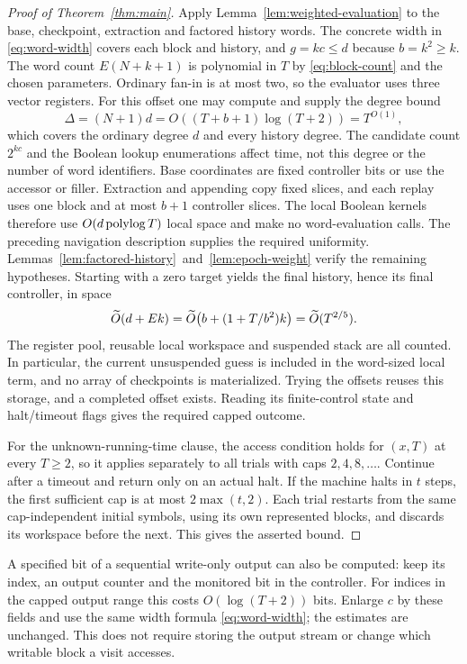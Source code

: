 \begin{proof}[Proof of Theorem~\ref{thm:main}]
Apply Lemma~\ref{lem:weighted-evaluation} to the base, checkpoint,
extraction and factored history words.
The concrete width in \eqref{eq:word-width} covers each block and
history, and \(g=kc\le d\) because \(b=k^2\ge k\). The word count
\(E(N+k+1)\) is polynomial in \(T\) by \eqref{eq:block-count} and the
chosen parameters. Ordinary fan-in is at most two, so the evaluator
uses three vector registers. For this offset one may compute and supply
the degree bound
\[
 \Delta=(N+1)d
 =O((T+b+1)\log(T+2))=T^{O(1)},
\]
which covers the ordinary degree \(d\) and every history degree.
The candidate count \(2^{kc}\) and the Boolean lookup enumerations
affect time, not this degree or the number of word identifiers.
Base coordinates are fixed controller bits or use the accessor or
filler. Extraction and appending copy fixed slices, and each replay
uses one block and at most \(b+1\) controller slices. The local
Boolean kernels therefore use
\(O(d\operatorname{polylog} T)\) local space and make no word-evaluation calls.
The preceding navigation description supplies the required uniformity.
\mbox{Lemmas~\ref{lem:factored-history} and~\ref{lem:epoch-weight}} verify
the remaining hypotheses. Starting with a zero target yields
the final history, hence its final controller, in space
\[
 \widetilde O(d+Ek)=
 \widetilde O\!\left(b+(1+T/b^2)k\right)
 =\widetilde O(T^{2/5}).
\]
The register pool, reusable local workspace and suspended stack are
all counted. In particular, the current unsuspended guess is included
in the word-sized local term, and no array of checkpoints is materialized.
Trying the offsets reuses this storage, and a completed offset
exists. Reading its finite-control state and halt/timeout flags gives
the required capped outcome.

For the unknown-running-time clause, the access condition holds for
\((x,T)\) at every \(T\ge2\), so it applies separately to all trials
with caps \(2,4,8,\ldots\). Continue after a timeout and return only on
an actual halt. If the machine halts in \(t\) steps, the first sufficient
cap is at most \(2\max(t,2)\). Each trial restarts from the same
cap-independent initial symbols, using its own represented blocks, and
discards its workspace before the next. This gives the asserted bound.
\end{proof}

\begin{remark}
\label{rem:output}
A specified bit of a sequential write-only output can also be
computed: keep its index, an output counter and the monitored bit in
the controller. For indices in the capped output range this costs
\(O(\log(T+2))\) bits. Enlarge \(c\) by these fields and use the same
width formula \eqref{eq:word-width}; the estimates are unchanged.
This does not require storing the output stream or change which
writable block a visit accesses.
\end{remark}

